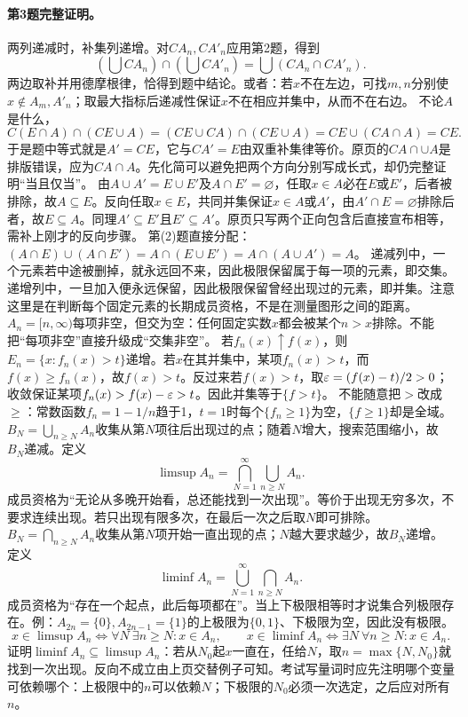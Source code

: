 \paragraph{第3题完整证明。}两列递减时，补集列递增。对$CA_n,CA'_n$应用第2题，得到
\[(\bigcup CA_n)\cap(\bigcup CA'_n)=\bigcup(CA_n\cap CA'_n).\]
两边取补并用德摩根律，恰得到题中结论。或者：若$x$不在左边，可找$m,n$分别使$x\notin A_m,A'_n$；取最大指标后递减性保证$x$不在相应并集中，从而不在右边。
不论$A$是什么，
\[C(E\cap A)\cap(CE\cup A)=(CE\cup CA)\cap(CE\cup A)=CE\cup(CA\cap A)=CE.\]
于是题中等式就是$A'=CE$，它与$CA'=E$由双重补集律等价。原页的$CA\cap\cup A$是排版错误，应为$CA\cap A$。先化简可以避免把两个方向分别写成长式，却仍完整证明“当且仅当”。
由$A\cup A'=E\cup E'$及$A\cap E'=\varnothing$，任取$x\in A$必在$E$或$E'$，后者被排除，故$A\subseteq E$。反向任取$x\in E$，共同并集保证$x\in A$或$A'$，由$A'\cap E=\varnothing$排除后者，故$E\subseteq A$。同理$A'\subseteq E'$且$E'\subseteq A'$。原页只写两个正向包含后直接宣布相等，需补上刚才的反向步骤。
第(2)题直接分配：$(A\cap E)\cup(A\cap E')=A\cap(E\cup E')=A\cap(A\cup A')=A$。
递减列中，一个元素若中途被删掉，就永远回不来，因此极限保留属于每一项的元素，即交集。递增列中，一旦加入便永远保留，因此极限保留曾经出现过的元素，即并集。注意这里是在判断每个固定元素的长期成员资格，不是在测量图形之间的距离。
$A_n=[n,\infty)$每项非空，但交为空：任何固定实数$x$都会被某个$n>x$排除。不能把“每项非空”直接升级成“交集非空”。
若$f_n(x)\uparrow f(x)$，则$E_n=\{x:f_n(x)>t\}$递增。若$x$在其并集中，某项$f_n(x)>t$，而$f(x)\ge f_n(x)$，故$f(x)>t$。反过来若$f(x)>t$，取$\varepsilon=(f(x)-t)/2>0$；收敛保证某项$f_n(x)>f(x)-\varepsilon>t$。因此并集等于$\{f>t\}$。
不能随意把$>$改成$\ge$：常数函数$f_n=1-1/n$趋于1，$t=1$时每个$\{f_n\ge1\}$为空，$\{f\ge1\}$却是全域。
$B_N=\bigcup_{n\ge N}A_n$收集从第$N$项往后出现过的点；随着$N$增大，搜索范围缩小，故$B_N$递减。定义
\[\limsup A_n=\bigcap_{N=1}^{\infty}\bigcup_{n\ge N}A_n.\]
成员资格为“无论从多晚开始看，总还能找到一次出现”。等价于出现无穷多次，不要求连续出现。若只出现有限多次，在最后一次之后取$N$即可排除。
$B_N=\bigcap_{n\ge N}A_n$收集从第$N$项开始一直出现的点；$N$越大要求越少，故$B_N$递增。定义
\[\liminf A_n=\bigcup_{N=1}^{\infty}\bigcap_{n\ge N}A_n.\]
成员资格为“存在一个起点，此后每项都在”。当上下极限相等时才说集合列极限存在。例：$A_{2n}=\{0\},A_{2n-1}=\{1\}$的上极限为$\{0,1\}$、下极限为空，因此没有极限。
\[x\in\limsup A_n\iff\forall N\ \exists n\ge N:x\in A_n,\qquad
x\in\liminf A_n\iff\exists N\ \forall n\ge N:x\in A_n.\]
证明$\liminf A_n\subseteq\limsup A_n$：若从$N_0$起$x$一直在，任给$N$，取$n=\max\{N,N_0\}$就找到一次出现。反向不成立由上页交替例子可知。考试写量词时应先注明哪个变量可依赖哪个：上极限中的$n$可以依赖$N$；下极限的$N_0$必须一次选定，之后应对所有$n$。
